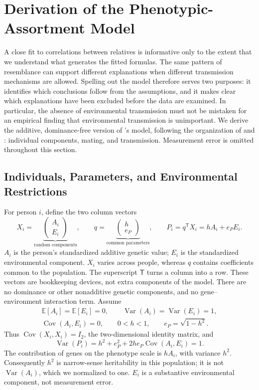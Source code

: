 \section{Derivation of the Phenotypic-Assortment Model}
\label{app:fisher}

A close fit to correlations between relatives is informative only to the
extent that we understand what generates the fitted formulas. The same
pattern of resemblance can support different explanations when different
transmission mechanisms are allowed. Spelling out the model therefore
serves two purposes: it identifies which conclusions follow from the
assumptions, and it makes clear which explanations have been excluded
before the data are examined. In particular, the absence of environmental
transmission must not be mistaken for an empirical finding that
environmental transmission is unimportant. We derive the additive,
dominance-free version of \citet{Fisher1918}'s model, following the organization of
\citet{Goldberger1978} and \citet{OttoEtAl1994}: individual components,
mating, and transmission. Measurement error is omitted throughout this
section.

\subsection{Individuals, Parameters, and Environmental Restrictions}
\label{app:model-components}

For person $i$, define the two column vectors
\[
 X_i=\underbrace{\begin{pmatrix}A_i\\E_i\end{pmatrix}}_{\text{random components}},
 \qquad
 q=\underbrace{\begin{pmatrix}h\\e_P\end{pmatrix}}_{\text{common parameters}},
 \qquad P_i=q^{\mathsf T}X_i=hA_i+e_P E_i.
\]
$A_i$ is the person's standardized additive genetic value; $E_i$ is the
standardized environmental component. $X_i$ varies across people, whereas
$q$ contains coefficients common to the population. The superscript
$\mathsf T$ turns a column into a row. These vectors are bookkeeping
devices, not extra components of the model. There are no dominance or other nonadditive genetic components, and no gene--environment interaction term. Assume
\begin{equation}
 \begin{gathered}
 \mathbb E[A_i]=\mathbb E[E_i]=0,\qquad
 \operatorname{Var}(A_i)=\operatorname{Var}(E_i)=1,\\
 \operatorname{Cov}(A_i,E_i)=0,\qquad
 0<h<1,\qquad e_P=\sqrt{1-h^2}.
 \end{gathered}
 \label{eq:model-raw}
\end{equation}
Thus $\operatorname{Cov}(X_i,X_i)=I_2$, the two-dimensional identity
matrix, and
\[
 \operatorname{Var}(P_i)=h^2+e_P^2+2h e_P\operatorname{Cov}(A_i,E_i)=1.
\]
The contribution of genes on the phenotype scale is $hA_i$, with variance
$h^2$. Consequently $h^2$ is narrow-sense heritability in this population;
it is not $\operatorname{Var}(A_i)$, which we normalized to one.
$E_i$ is a substantive environmental component, not measurement error.

